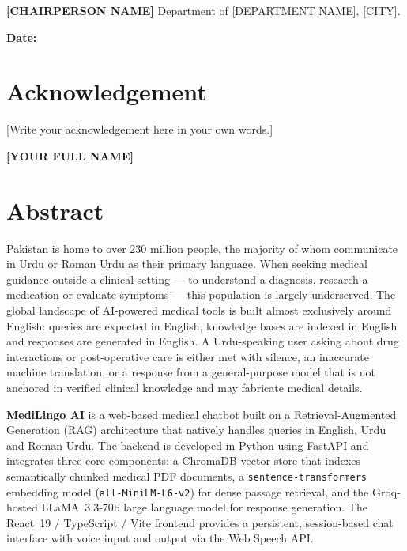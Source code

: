 \documentclass[12pt, a4paper, oneside]{report}
\begin{document}
\noindent\textbf{[CHAIRPERSON NAME]}\newline
Department of [DEPARTMENT NAME], [CITY].

\vspace{2cm}
\noindent
\textbf{\color{primary}Date:}\quad\underline{\hspace{5cm}}

\clearpage
\chapter*{Acknowledgement}

[Write your acknowledgement here in your own words.]

\vspace{1.5cm}
\hfill\textbf{\color{primary}[YOUR FULL NAME]}

\clearpage
\chapter*{Abstract}

Pakistan is home to over 230 million people, the majority of whom communicate in Urdu or
Roman Urdu as their primary language. When seeking medical guidance outside a clinical
setting --- to understand a diagnosis, research a medication or evaluate symptoms --- this
population is largely underserved. The global landscape of AI-powered medical tools is
built almost exclusively around English: queries are expected in English, knowledge bases
are indexed in English and responses are generated in English. A Urdu-speaking user asking
about drug interactions or post-operative care is either met with silence, an inaccurate
machine translation, or a response from a general-purpose model that is not anchored in
verified clinical knowledge and may fabricate medical details.

\textbf{MediLingo AI} is a web-based medical chatbot built on a Retrieval-Augmented
Generation (RAG) architecture that natively handles queries in English, Urdu and Roman
Urdu. The backend is developed in Python using FastAPI and integrates three core
components: a ChromaDB vector store that indexes semantically chunked medical PDF
documents, a \texttt{sentence-transformers} embedding model (\texttt{all-MiniLM-L6-v2})
for dense passage retrieval, and the Groq-hosted LLaMA~3.3-70b large language model for
response generation. The React~19 / TypeScript / Vite frontend provides a persistent,
session-based chat interface with voice input and output via the Web Speech API.
\end{document}
